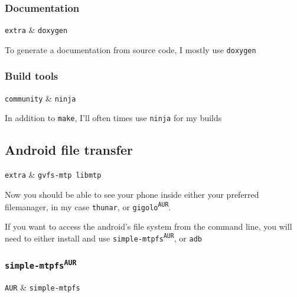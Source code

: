\documentclass[10pt]{dustdoc}
\begin{document}
\subsubsection{Documentation}
\label{sec:documentation}

\begin{packagetable}
    \texttt{extra} & \texttt{doxygen} \\ 
\end{packagetable}

To generate a documentation from source code, I mostly use \texttt{doxygen}

\subsubsection{Build tools}
\label{sec:build-tools}

\begin{packagetable}
    \texttt{community} & \texttt{ninja} \\ 
\end{packagetable}

In addition to \texttt{make}, I’ll often times use \texttt{ninja} for my builds

\subsection{Android file transfer}
\label{sec:android-file-transfer}

\begin{packagetable}
    \texttt{extra} & \texttt{gvfs-mtp libmtp} \\ 
\end{packagetable}

Now you should be able to see your phone inside either your preferred filemanager, in my case \texttt{thunar}, or \texttt{gigolo\textsuperscript{\texttt{AUR}}}.

If you want to access the android’s file system from the command line, you will need to either install and use \texttt{simple-mtpfs\textsuperscript{\texttt{AUR}}}, or \texttt{adb}

\subsubsection{\texttt{simple-mtpfs\texorpdfstring{\textsuperscript{AUR}}{ (AUR)}}}
\label{sec:simple-mtpfs-aur}

\begin{packagetable}
    \texttt{AUR} & \texttt{simple-mtpfs} \\ 
\end{packagetable}
\end{document}
